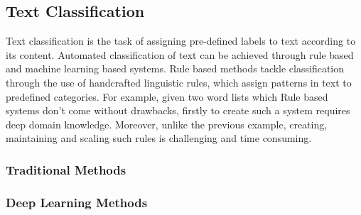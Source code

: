 \subsection{Text Classification}
Text classification is the task of assigning pre-defined labels to text according to its content. Automated classification of text can be achieved through rule based and machine learning based systems. Rule based methods tackle classification through the use of handcrafted linguistic rules, which assign patterns in text to predefined categories. For example, given two word lists which  Rule based systems don't come without drawbacks, firstly to create such a system requires deep domain knowledge. Moreover, unlike the previous example, creating, maintaining and scaling such rules is challenging and time consuming. 
\subsubsection{Traditional Methods} 
\subsubsection{Deep Learning Methods}